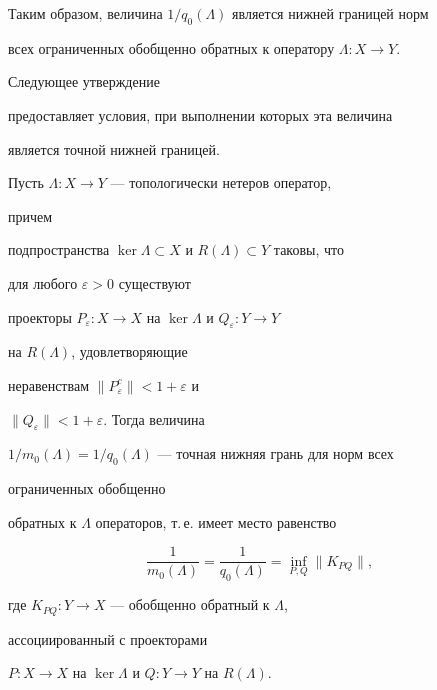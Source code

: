 


Таким образом, величина $1/q_0(\Lambda)$ является нижней границей норм 


всех ограниченных обобщенно обратных к оператору $\Lambda:X\to Y$. 


Следующее утверждение 


предоставляет условия, при выполнении которых эта величина  


является точной нижней границей. 


 


\begin{thm} Пусть $\Lambda:X\to Y$ --- топологически нетеров оператор, 


причем 


подпространства $\ker\Lambda\subset X$ и $R(\Lambda)\subset Y$ таковы, что 


для любого $\varepsilon>0$ существуют 


проекторы $P_\varepsilon:X\to X$ на $\ker\Lambda$ и $Q_\varepsilon:Y\to Y$ 


на $R(\Lambda)$, удовлетворяющие 


неравенствам $\|P^c_\varepsilon\|<1+\varepsilon$ и 


$\|Q_\varepsilon\|<1+\varepsilon$. Тогда величина 


$1/m_0(\Lambda)=1/q_0(\Lambda)$ --- точная нижняя грань для норм всех 


ограниченных обобщенно 


обратных к $\Lambda$ операторов, т.\,е. имеет место равенство 


\begin{equation} 


\frac{1}{m_0(\Lambda)}=\frac{1}{q_0(\Lambda)} 


=\inf_{P,Q}\|K_{PQ}\|, 


\end{equation} 


где $K_{PQ}:Y\to X$ --- обобщенно обратный к $\Lambda$, 


ассоциированный с проекторами 


$P:X\to X$ на $\ker\Lambda$ и $Q:Y\to Y$ на $R(\Lambda)$. 


\end{thm} 


 


